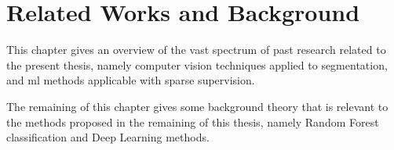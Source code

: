 \chapter{Related Works and Background}

\renewcommand{\thealgsubstate}{\alph{algsubstate}}
\newenvironment{algsubstates}
  {\setcounter{algsubstate}{0}%
   \renewcommand{\State}{%
     \stepcounter{algsubstate}%
     \Statex {\footnotesize\thealgsubstate:}\space}}
  {}

This chapter gives an overview of the vast spectrum of past research related to the present thesis, namely computer vision techniques applied to segmentation, and \gls{ml} methods applicable with sparse supervision.

The remaining of this chapter gives some background theory that is relevant to the methods proposed in the remaining of this thesis, namely Random Forest classification and Deep Learning methods.





